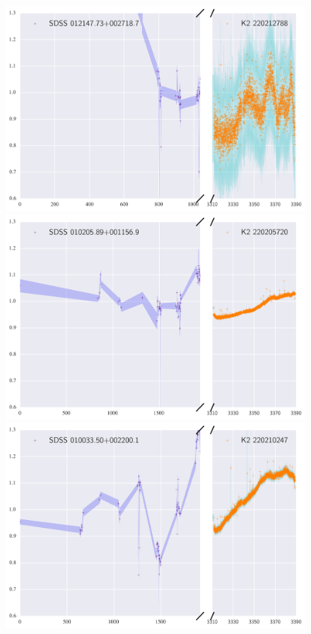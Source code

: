 \documentclass[a4paper,fleqn,usenatbib]{mnras}
\begin{document}
 
 
  \begin{figure}
 	\includegraphics[width=\columnwidth]{220212788ExtendedLC.png}
 	\includegraphics[width=\columnwidth]{220205720ExtendedLC.png}
 	\includegraphics[width=\columnwidth]{220210247ExtendedLC.png}
  	\caption{}
  	\label{fig:example_figure}
  \end{figure}
  
\end{document}

